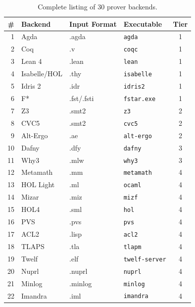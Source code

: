 \documentclass[11pt,a4paper]{article}
\begin{document}
\begin{table}[htbp]
\centering
\caption{Complete listing of 30 prover backends.}
\label{tab:full-backends}
\small
\begin{tabular}{@{}rlllc@{}}
\toprule
\textbf{\#} & \textbf{Backend} & \textbf{Input Format} & \textbf{Executable} & \textbf{Tier} \\
\midrule
1  & Agda        & .agda       & \texttt{agda}          & 1 \\
2  & Coq         & .v          & \texttt{coqc}          & 1 \\
3  & Lean 4      & .lean       & \texttt{lean}          & 1 \\
4  & Isabelle/HOL & .thy       & \texttt{isabelle}      & 1 \\
5  & Idris 2     & .idr        & \texttt{idris2}        & 1 \\
6  & F*          & .fst/.fsti  & \texttt{fstar.exe}     & 1 \\
7  & Z3          & .smt2       & \texttt{z3}            & 2 \\
8  & CVC5        & .smt2       & \texttt{cvc5}          & 2 \\
9  & Alt-Ergo    & .ae         & \texttt{alt-ergo}      & 2 \\
10 & Dafny       & .dfy        & \texttt{dafny}         & 3 \\
11 & Why3        & .mlw        & \texttt{why3}          & 3 \\
12 & Metamath    & .mm         & \texttt{metamath}      & 4 \\
13 & HOL Light   & .ml         & \texttt{ocaml}         & 4 \\
14 & Mizar       & .miz        & \texttt{mizf}          & 4 \\
15 & HOL4        & .sml        & \texttt{hol}           & 4 \\
16 & PVS         & .pvs        & \texttt{pvs}           & 4 \\
17 & ACL2        & .lisp       & \texttt{acl2}          & 4 \\
18 & TLAPS       & .tla        & \texttt{tlapm}         & 4 \\
19 & Twelf       & .elf        & \texttt{twelf-server}  & 4 \\
20 & Nuprl       & .nuprl      & \texttt{nuprl}         & 4 \\
21 & Minlog      & .minlog     & \texttt{minlog}        & 4 \\
22 & Imandra     & .iml        & \texttt{imandra}       & 4 \\

\end{tabular}
\end{table}
\end{document}
